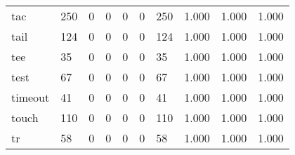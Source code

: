 \begin{longtable}{lp{1.3cm}p{1.3cm}p{1.3cm}p{1.3cm}p{1.3cm}p{1.3cm}p{1.3cm}p{1.3cm}p{1.3cm}}
tac       &                    250 &                                             0 &                                            0 &                                           0 &                                            0 &                                        250 &                                1.000 &                                  1.000 &                                1.000 \\
tail      &                    124 &                                             0 &                                            0 &                                           0 &                                            0 &                                        124 &                                1.000 &                                  1.000 &                                1.000 \\
tee       &                     35 &                                             0 &                                            0 &                                           0 &                                            0 &                                         35 &                                1.000 &                                  1.000 &                                1.000 \\
test      &                     67 &                                             0 &                                            0 &                                           0 &                                            0 &                                         67 &                                1.000 &                                  1.000 &                                1.000 \\
timeout   &                     41 &                                             0 &                                            0 &                                           0 &                                            0 &                                         41 &                                1.000 &                                  1.000 &                                1.000 \\
touch     &                    110 &                                             0 &                                            0 &                                           0 &                                            0 &                                        110 &                                1.000 &                                  1.000 &                                1.000 \\
tr        &                     58 &                                             0 &                                            0 &                                           0 &                                            0 &                                         58 &                                1.000 &                                  1.000 &                                1.000 \\

\end{longtable}

